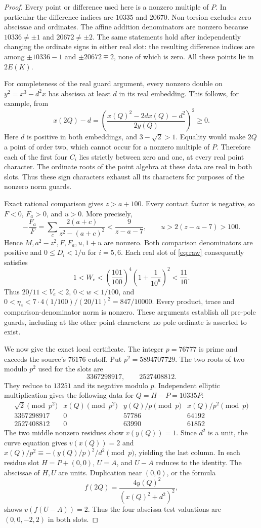 \documentclass[11pt,a4paper]{article}
\begin{document}
\begin{proof}
Every point or difference used here is a nonzero multiple of $P$.
In particular the difference indices are $10335$ and $20670$.
Non-torsion excludes zero abscissae and ordinates. The affine addition
denominators are nonzero because $10336\ne\pm1$ and
$20672\ne\pm2$. The same statements hold after independently
changing the ordinate signs in either real slot: the resulting
difference indices are among $\pm10336-1$ and
$\pm20672\mp2$, none of which is zero. All these points lie in
$2E(K)$.

For completeness of the real guard argument, every nonzero double on
$y^2=x^3-d^2x$ has abscissa at least $d$ in its real embedding.
This follows, for example, from
\[
 x(2Q)-d=
 \left(\frac{x(Q)^2-2d x(Q)-d^2}{2y(Q)}\right)^2\ge0.
\]
Here $d$ is positive in both embeddings, and $3-\sqrt2>1$.
Equality would make $2Q$ a point of order two, which cannot occur
for a nonzero multiple of $P$. Therefore each of the first four
$C_i$ lies strictly between zero and one, at every real point
character. The ordinate roots of the point algebra at these data
are real in both slots. Thus these sign characters exhaust all its
characters for purposes of the nonzero norm guards.

Exact rational comparison gives $z>a+100$. Every contact factor is
negative, so $F<0$, $F_a>0$, and $u>0$. More precisely,
\[
 -\frac{F_a}{F}
  =\sum_c\frac{2(a+c)}{z^2-(a+c)^2}
       <\frac9{z-a-7},\qquad u>2(z-a-7)>100.
\]
Hence $M,a^2-z^2,F,F_a,u,1+u$ are nonzero. Both comparison
denominators are positive and $0\le D_i<1/u$ for $i=5,6$.
Each real slot of \eqref{eq:raw} consequently satisfies
\[
 1<W_e<\left(\frac{101}{100}\right)^4
              \left(1+\frac1{10^6}\right)^2<\frac{11}{10}.
\]
Thus $20/11<V_e<2$, $0<w<1/100$, and
$0<\eta_e<7\cdot4(1/100)/(20/11)^2=847/10000$.
Every product, trace and comparison-denominator norm is nonzero.
These arguments establish all pre-pole guards, including at the other
point characters; no pole ordinate is asserted to exist.

We now give the exact local certificate. The integer $p=76777$ is
prime and exceeds the source's $76176$ cutoff. Put
$p^2=5894707729$. The two roots of two modulo $p^2$ used for the
slots are
\[
                    3367298917,\qquad2527408812.
\]
They reduce to $13251$ and its negative modulo $p$. Independent
elliptic multiplication gives the following data for $Q=H-P=10335P$:
\[
\begin{array}{c|r|r|r}
 \sqrt2\pmod {p^2}&x(Q)\pmod {p^2}& y(Q)/p\pmod p&x(Q)/p^2\pmod p\\
 \hline
 3367298917&0&57786&64192\\
 2527408812&0&63990&61852
\end{array}
\]
The two middle nonzero residues show $v(y(Q))=1$. Since $d^2$ is
a unit, the curve equation gives $v(x(Q))=2$ and
$x(Q)/p^2\equiv-(y(Q)/p)^2/d^2\pmod p$, yielding the last column.
In each residue slot $H=P+(0,0)$, $U=A$, and $U-A$ reduces to
the identity. The abscissae of $H,U$ are units. Duplication near
$(0,0)$, or the formula
\[
            f(2Q)=\frac{4y(Q)^2}{(x(Q)^2+d^2)^2},
\]
shows $v(f(U-A))=2$. Thus the four abscissa-test valuations are
$(0,0,-2,2)$ in both slots.


\end{proof}
\end{document}
